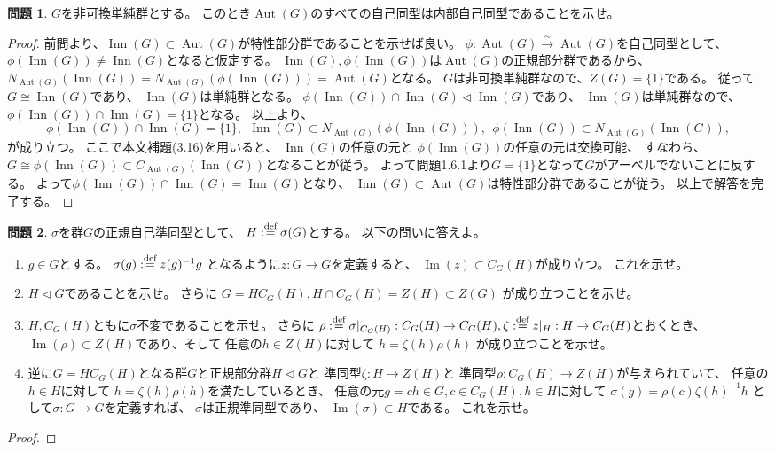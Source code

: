 \documentclass[uplatex]{jsreport}
\theoremstyle{definition}
\newtheorem{prob}[prob]{問題}
\DeclareMathOperator{\im}{\mathrm{Im}}
\DeclareMathOperator{\INN}{\mathrm{Inn}}
\DeclareMathOperator{\Aut}{\mathrm{Aut}}
\newcommand{\dfn}{:\overset{\mbox{{\scriptsize def}}}{=}}
\begin{document}
\begin{prob}
  \(G\)を非可換単純群とする。
  このとき\(\Aut(G)\)のすべての自己同型は内部自己同型であることを示せ。
\end{prob}

\begin{proof}
  前問より、\(\INN(G)\subset \Aut(G)\)が特性部分群であることを示せば良い。
  \(\phi:\Aut(G) \xrightarrow{\sim} \Aut(G)\)を自己同型として、
  \(\phi(\INN(G)) \neq \INN(G)\)となると仮定する。
  \(\INN(G),\phi(\INN(G))\)は\(\Aut(G)\)の正規部分群であるから、
  \(N_{\Aut(G)}(\INN(G)) = N_{\Aut(G)}(\phi(\INN(G))) = \Aut(G)\)となる。
  \(G\)は非可換単純群なので、\(Z(G) = \{1\}\)である。
  従って\(G\cong \INN(G)\)であり、
  \(\INN(G)\)は単純群となる。
  \(\phi(\INN(G)) \cap \INN(G)\lhd \INN(G)\)であり、
  \(\INN(G)\)は単純群なので、
  \(\phi(\INN(G)) \cap \INN(G) = \{1\}\)となる。
  以上より、
  \[
  \phi(\INN(G)) \cap \INN(G) = \{1\}, \ \
  \INN(G) \subset N_{\Aut(G)}(\phi(\INN(G))), \ \
  \phi(\INN(G)) \subset N_{\Aut(G)}(\INN(G)),
  \]
  が成り立つ。
  ここで本文補題(3.16)を用いると、
  \(\INN(G)\)の任意の元と
  \(\phi(\INN(G))\)の任意の元は交換可能、
  すなわち、\(G\cong \phi(\INN(G)) \subset C_{\Aut(G)}(\INN(G))\)となることが従う。
  よって問題1.6.1より\(G = \{1\}\)となって\(G\)がアーベルでないことに反する。
  よって\(\phi(\INN(G))\cap \INN(G) = \INN(G)\)となり、
  \(\INN(G)\subset \Aut(G)\)は特性部分群であることが従う。
  以上で解答を完了する。
\end{proof}



\begin{prob}
  \(\sigma\)を群\(G\)の正規自己準同型として、
  \(H\dfn \sigma(G)\)とする。
  以下の問いに答えよ。
  \begin{enumerate}
    \item
    \(g\in G\)とする。
    \(\sigma(g) \dfn z(g)^{-1}g\)
    となるように\(z:G\to G\)を定義すると、
    \(\im(z) \subset C_G(H)\)が成り立つ。
    これを示せ。
    \item
    \(H\lhd G\)であることを示せ。
    さらに
    \(G = HC_G(H), H\cap C_G(H) = Z(H) \subset Z(G)\)
    が成り立つことを示せ。
    \item
    \(H,C_G(H)\)ともに\(\sigma\)不変であることを示せ。
    さらに
    \(\rho\dfn \sigma|_{C_G(H)}: C_G(H)\to C_G(H),
    \zeta \dfn z|_H:H\to C_G(H)\)とおくとき、
    \(\im(\rho)\subset Z(H)\)であり、そして
    任意の\(h\in Z(H)\)に対して
    \(h = \zeta(h)\rho(h)\)
    が成り立つことを示せ。
    \item
    逆に\(G = HC_G(H)\)となる群\(G\)と正規部分群\(H\lhd G\)と
    準同型\(\zeta:H\to Z(H)\)と
    準同型\(\rho:C_G(H) \to Z(H)\)が与えられていて、
    任意の\(h\in H\)に対して
    \(h = \zeta(h)\rho(h)\)を満たしているとき、
    任意の元\(g = ch\in G, c\in C_G(H), h\in H\)に対して
    \(\sigma(g) = \rho(c)\zeta(h)^{-1}h\)
    として\(\sigma:G\to G\)を定義すれば、
    \(\sigma\)は正規準同型であり、
    \(\im(\sigma)\subset H\)である。
    これを示せ。
  \end{enumerate}
\end{prob}


\begin{proof}

\end{proof}
\end{document}
